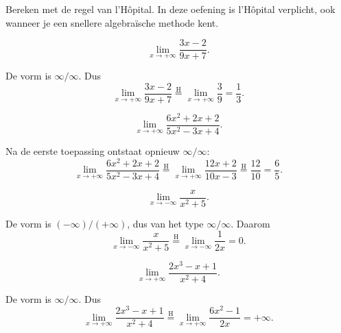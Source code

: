 \documentclass{ximera}
\begin{document}
\begin{oefening}{\oefB\ESS}

Bereken met de regel van l'Hôpital. In deze oefening is l'Hôpital
verplicht, ook wanneer je een snellere algebraïsche methode kent.

\begin{question}
\[\lim_{x\to+\infty}\frac{3x-2}{9x+7}.\]

\begin{oplossing}
De vorm is \(\infty/\infty\). Dus
\[\lim_{x\to+\infty}\frac{3x-2}{9x+7}\overset{\mathrm H}{=}\lim_{x\to+\infty}\frac39=\frac13.\]
\end{oplossing}
\end{question}

\begin{question}
\[\lim_{x\to+\infty}\frac{6x^2+2x+2}{5x^2-3x+4}.\]

\begin{oplossing}
Na de eerste toepassing ontstaat opnieuw \(\infty/\infty\):
\[\lim_{x\to+\infty}\frac{6x^2+2x+2}{5x^2-3x+4}\overset{\mathrm H}{=}\lim_{x\to+\infty}\frac{12x+2}{10x-3}\overset{\mathrm H}{=}\frac{12}{10}=\frac65.\]
\end{oplossing}
\end{question}

\begin{question}
\[\lim_{x\to-\infty}\frac{x}{x^2+5}.\]

\begin{oplossing}
De vorm is \((-\infty)/(+\infty)\), dus van het type
\(\infty/\infty\). Daarom
\[\lim_{x\to-\infty}\frac{x}{x^2+5}\overset{\mathrm H}{=}\lim_{x\to-\infty}\frac1{2x}=0.\]
\end{oplossing}
\end{question}

\begin{question}
\[\lim_{x\to+\infty}\frac{2x^3-x+1}{x^2+4}.\]

\begin{oplossing}
De vorm is \(\infty/\infty\). Dus
\[\lim_{x\to+\infty}\frac{2x^3-x+1}{x^2+4}\overset{\mathrm H}{=}\lim_{x\to+\infty}\frac{6x^2-1}{2x}=+\infty.\]
\end{oplossing}
\end{question}
\end{oefening}
\end{document}

